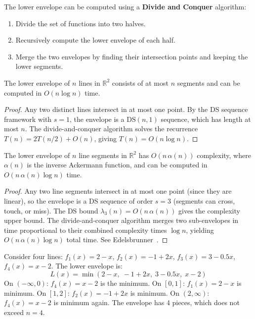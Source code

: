 The lower envelope can be computed using a \textbf{Divide and Conquer} algorithm:
\begin{enumerate}
    \item Divide the set of functions into two halves.
    \item Recursively compute the lower envelope of each half.
    \item Merge the two envelopes by finding their intersection points and keeping the lower segments.
\end{enumerate}

\begin{theorem}\label{thm:lower_envelope_lines}
The lower envelope of $n$ lines in $\mathbb{R}^2$ consists of at most $n$ segments and can be computed in $O(n \log n)$ time.
\end{theorem}

\begin{proof}
Any two distinct lines intersect in at most one point. By the DS sequence framework with $s = 1$, the envelope is a $\text{DS}(n, 1)$ sequence, which has length at most $n$. The divide-and-conquer algorithm solves the recurrence $T(n) = 2T(n/2) + O(n)$, giving $T(n) = O(n \log n)$.
\end{proof}

\begin{theorem}\label{thm:lower_envelope_segments}
The lower envelope of $n$ line segments in $\mathbb{R}^2$ has $O(n\,\alpha(n))$ complexity, where $\alpha(n)$ is the inverse Ackermann function, and can be computed in $O(n\,\alpha(n) \log n)$ time.
\end{theorem}

\begin{proof}
Any two line segments intersect in at most one point (since they are linear), so the envelope is a DS sequence of order $s = 3$ (segments can cross, touch, or miss). The DS bound $\lambda_3(n) = O(n\,\alpha(n))$ gives the complexity upper bound. The divide-and-conquer algorithm merges two sub-envelopes in time proportional to their combined complexity times $\log n$, yielding $O(n\,\alpha(n) \log n)$ total time. See Edelsbrunner~\cite[Chapter~4]{edelsbrunner1987}.
\end{proof}



\begin{example}\label{ex:lower_envelope_lines}
Consider four lines: $f_1(x) = 2 - x$, $f_2(x) = -1 + 2x$, $f_3(x) = 3 - 0.5x$, $f_4(x) = x - 2$.
The lower envelope is:
\[
L(x) = \min(2 - x,\; -1 + 2x,\; 3 - 0.5x,\; x - 2)
\]
On $(-\infty, 0)$: $f_4(x) = x-2$ is the minimum. On $[0, 1]$: $f_1(x) = 2-x$ is minimum. On $[1, 2]$: $f_2(x) = -1+2x$ is minimum. On $(2, \infty)$: $f_4(x) = x-2$ is minimum again. The envelope has 4 pieces, which does not exceed $n = 4$.
\end{example}

